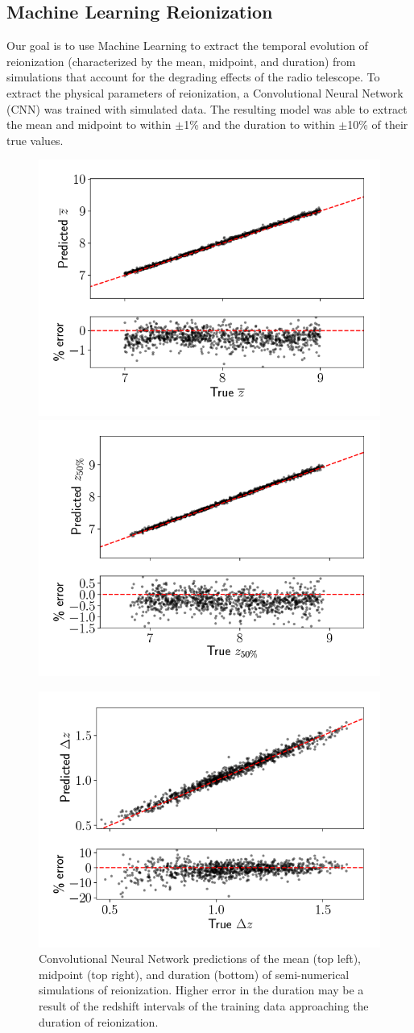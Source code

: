 \documentclass[a0,landscape]{a0poster}
\begin{document}
\begin{multicols}{4}
\subsection*{Machine Learning Reionization}
Our goal is to use Machine Learning to extract the temporal evolution of reionization (characterized by the mean, midpoint, and duration) from simulations that account for the degrading effects of the radio telescope. To extract the physical parameters of reionization, a Convolutional Neural Network (CNN) was trained with simulated data.  The resulting model was able to extract the mean and midpoint to within $\pm$1\% and the duration to within $\pm$10\% of their true values.
\begin{figure}[H]
\centering
\includegraphics[width=0.4\linewidth]{figures/meanz1024_1.png}
\hspace{0.1in}
\includegraphics[width=0.4\linewidth]{figures/midpoint1024_1.png}
\end{figure}
\begin{figure}[H]
\centering
\vspace{-0.1in}
\includegraphics[width=0.4\linewidth]{figures/duration1024_1.png}
\caption{Convolutional Neural Network predictions of the mean (top left), midpoint (top right), and duration (bottom) of semi-numerical simulations of reionization. Higher error in the duration may be a result of the redshift intervals of the training data approaching the duration of reionization.}
\label{fig:DFCNArch}
\end{figure}




\end{multicols}
\end{document}
